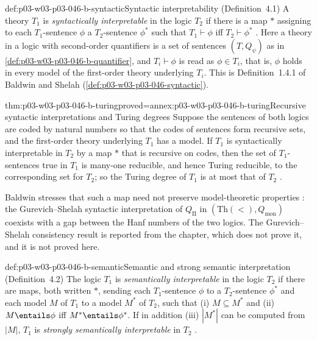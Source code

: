 \begin{hbdefinition}{def:p03-w03-p03-046-b-syntactic}{Syntactic interpretability (Definition~4.1)}
A theory \(T_1\) is \emph{syntactically interpretable} in the logic
\(T_2\) if there is a map \(*\) assigning to each \(T_1\)-sentence \(\phi\)
a \(T_2\)-sentence \(\phi^*\) such that \(T_1\vdash\phi\) iff
\(T_2\vdash\phi^*\) \cite[p.~470, Definition~4.1]{Baldwin1985DSOQ}. Here a
theory in a logic with second-order quantifiers is a set of sentences
\((T,Q_\psi)\) as in \cref{def:p03-w03-p03-046-b-quantifier}, and
\(T_i\vdash\phi\) is read as \(\phi\in T_i\), that is, \(\phi\) holds in
every model of the first-order theory underlying \(T_i\). This is
Definition~1.4.1 of Baldwin and Shelah
(\cref{def:p03-w03-p03-046-syntactic}).
\end{hbdefinition}

\begin{hblemma}{thm:p03-w03-p03-046-b-turing}{proved=annex:p03-w03-p03-046-b-turing}{Recursive syntactic interpretations and Turing degrees}
Suppose the sentences of both logics are coded by natural numbers so that
the codes of sentences form recursive sets, and the first-order theory
underlying \(T_1\) has a model. If \(T_1\) is syntactically interpretable
in \(T_2\) by a map \(*\) that is recursive on codes, then the set of
\(T_1\)-sentences true in \(T_1\) is many-one reducible, and hence Turing
reducible, to the corresponding set for \(T_2\); so the Turing degree of
\(T_1\) is at most that of \(T_2\) \cite[p.~470]{Baldwin1985DSOQ}.
\end{hblemma}

Baldwin stresses that such a map need not preserve model-theoretic
properties \cite[p.~470]{Baldwin1985DSOQ}: the Gurevich--Shelah syntactic
interpretation of \(Q_{\mathrm{II}}\) in \((\mathrm{Th}(<),Q_{\mathrm{mon}})\)
coexists with a gap between the Hanf numbers of the two logics. The
Gurevich--Shelah consistency result is reported from the chapter, which
does not prove it, and it is not proved here.

\begin{hbdefinition}{def:p03-w03-p03-046-b-semantic}{Semantic and strong semantic interpretation (Definition~4.2)}
The logic \(T_1\) is \emph{semantically interpretable} in the logic \(T_2\)
if there are maps, both written \(*\), sending each \(T_1\)-sentence
\(\phi\) to a \(T_2\)-sentence \(\phi^*\) and each model \(M\) of \(T_1\) to
a model \(M^*\) of \(T_2\), such that (i) \(M\subseteq M^*\) and (ii)
\(M\entails\phi\) iff \(M^*\entails\phi^*\). If in addition (iii)
\(|M^*|\) can be computed from \(|M|\), \(T_1\) is \emph{strongly
semantically interpretable} in \(T_2\)
\cite[p.~471, Definition~4.2]{Baldwin1985DSOQ}.
\end{hbdefinition}

